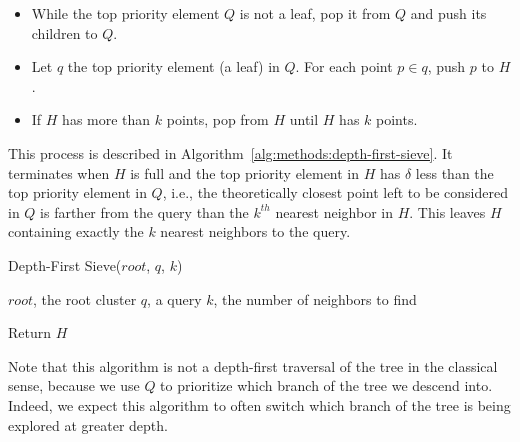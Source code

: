 \begin{itemize}
    \item While the top priority element $Q$ is not a leaf, pop it from $Q$ and push its children to $Q$.
    \item Let $q$ the top priority element (a leaf) in $Q$. For each point $p \in q$, push $p$ to $H$.
    \item If $H$ has more than $k$ points, pop from $H$ until $H$ has $k$ points.
\end{itemize}

This process is described in Algorithm~\ref{alg:methods:depth-first-sieve}.
It terminates when $H$ is full and the top priority element in $H$ has $\delta$ less than the top priority element in $Q$, i.e., the theoretically closest point left to be considered in $Q$ is farther from the query than the $k^{th}$ nearest neighbor in $H$.
This leaves $H$ containing exactly the $k$ nearest neighbors to the query.


\begin{algorithm} 
    \caption{Depth-First Sieve($root$, $q$, $k$)} 
    \label{alg:methods:depth-first-sieve} 
    \begin{algorithmic}
        \REQUIRE $root$, the root cluster
        \REQUIRE $q$, a query
        \REQUIRE $k$, the number of neighbors to find


            \ENDWHILE
            \ENDFOR
            \ENDWHILE
        \ENDWHILE
        \STATE Return $H$
    \end{algorithmic}
\end{algorithm}

Note that this algorithm is not a depth-first traversal of the tree in the classical sense, because we use $Q$ to prioritize which branch of the tree we descend into.
Indeed, we expect this algorithm to often switch which branch of the tree is being explored at greater depth.


